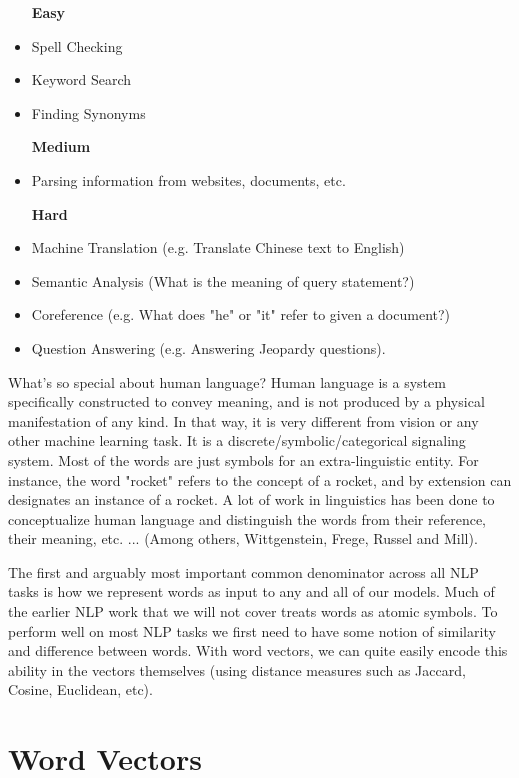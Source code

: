 \documentclass{tufte-handout}
\begin{document}
\begin{itemize}
\item [\textbf{Easy}]
\item Spell Checking
\item Keyword Search
\item Finding Synonyms
\item [\textbf{Medium}]
\item Parsing information from websites, documents, etc.
\item [\textbf{Hard}]
\item Machine Translation (e.g. Translate Chinese text to English)
\item Semantic Analysis (What is the meaning of query statement?)
\item Coreference (e.g. What does "he" or "it" refer to given a document?) 
\item Question Answering (e.g. Answering Jeopardy questions).
\end{itemize}

What's so special about human language? Human language is a system specifically constructed to convey meaning, and is not produced by a physical manifestation of any kind. In that way, it is very different from vision or any other machine learning task. It is a discrete/symbolic/categorical signaling system. Most of the words are just symbols for an extra-linguistic entity. For instance, the word "rocket" refers to the concept of a rocket, and by extension can designates an instance of a rocket. A lot of work in linguistics has been done to conceptualize human language and distinguish the words from their reference, their meaning, etc. ... (Among others, Wittgenstein, Frege, Russel and Mill).

The first and arguably most important common denominator across all NLP tasks is how we represent words as input to any and all of our models. Much of the earlier NLP work that we will not cover treats words as atomic symbols. To perform well on most NLP tasks we first need to have some notion of similarity and difference between words. With word vectors, we can quite easily encode this ability in the vectors themselves (using distance measures such as Jaccard, Cosine, Euclidean, etc).

\section{Word Vectors}\label{sec:wordvectors}
\end{document}

